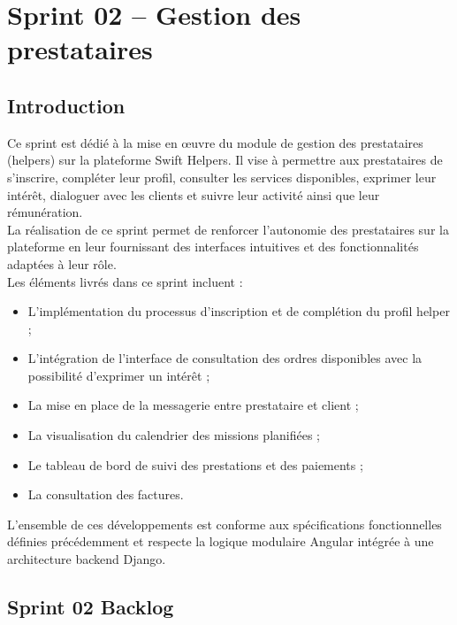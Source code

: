 \chapter{Sprint 02 – Gestion des prestataires}
\section*{Introduction}

Ce sprint est dédié à la mise en œuvre du module de gestion des prestataires (helpers) sur la plateforme Swift Helpers. Il vise à permettre aux prestataires de s’inscrire, compléter leur profil, consulter les services disponibles, exprimer leur intérêt, dialoguer avec les clients et suivre leur activité ainsi que leur rémunération.\\

La réalisation de ce sprint permet de renforcer l’autonomie des prestataires sur la plateforme en leur fournissant des interfaces intuitives et des fonctionnalités adaptées à leur rôle.\\

Les éléments livrés dans ce sprint incluent :
\begin{itemize}
  \item L’implémentation du processus d’inscription et de complétion du profil helper ;
  \item L’intégration de l’interface de consultation des ordres disponibles avec la possibilité d’exprimer un intérêt ;
  \item La mise en place de la messagerie entre prestataire et client ;
  \item La visualisation du calendrier des missions planifiées ;
  \item Le tableau de bord de suivi des prestations et des paiements ;
  \item La consultation des factures.
\end{itemize}

L’ensemble de ces développements est conforme aux spécifications fonctionnelles définies précédemment et respecte la logique modulaire Angular intégrée à une architecture backend Django.
\section*{Sprint 02 Backlog}


